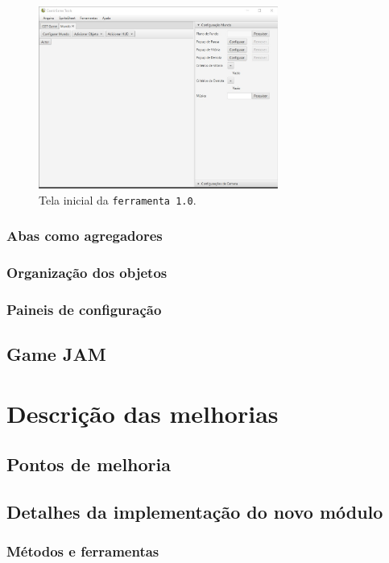 \documentclass[12pt,twoside,openright,a4paper,english,brazil,sumario=tradicional]{abntex2}
\begin{document}
\begin{figure}[htb]
\label{fig:dificuldades-1}
\centering
\includegraphics[width=0.7\textwidth]{images/dificuldades-1.jpg}
\caption{Tela inicial da \texttt{ferramenta 1.0}.}
\end{figure}

\subsection{Abas como agregadores}

\subsection{Organização dos objetos}

\subsection{Paineis de configuração}

\section{Game JAM} %

\chapter{Descrição das melhorias} %
\label{chap:melhorias}
\section{Pontos de melhoria}
\section{Detalhes da implementação do novo módulo}
\subsection{Métodos e ferramentas}
\end{document}
